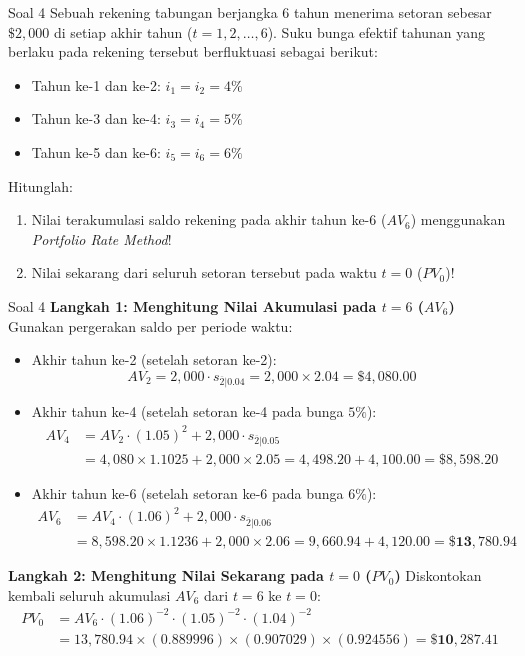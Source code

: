 \documentclass[11pt,a4paper]{article}
\begin{document}
\begin{problembox}{Soal 4}
Sebuah rekening tabungan berjangka 6 tahun menerima setoran sebesar $\$2{,}000$ di setiap akhir tahun ($t = 1, 2, \dots, 6$). Suku bunga efektif tahunan yang berlaku pada rekening tersebut berfluktuasi sebagai berikut:
\begin{itemize}
    \item Tahun ke-1 dan ke-2: $i_1 = i_2 = 4\%$
    \item Tahun ke-3 dan ke-4: $i_3 = i_4 = 5\%$
    \item Tahun ke-5 dan ke-6: $i_5 = i_6 = 6\%$
\end{itemize}
Hitunglah:
\begin{enumerate}[label=(\alph*)]
    \item Nilai terakumulasi saldo rekening pada akhir tahun ke-6 ($AV_6$) menggunakan \textit{Portfolio Rate Method}!
    \item Nilai sekarang dari seluruh setoran tersebut pada waktu $t = 0$ ($PV_0$)!
\end{enumerate}
\end{problembox}

\begin{solutionbox}{Soal 4}
\textbf{Langkah 1: Menghitung Nilai Akumulasi pada $t = 6$ ($AV_6$)}
Gunakan pergerakan saldo per periode waktu:
\begin{itemize}
    \item Akhir tahun ke-2 (setelah setoran ke-2):
    \begin{equation*}
        AV_2 = 2{,}000 \cdot s_{\overline{2}|0.04} = 2{,}000 \times 2.04 = \$4{,}080.00
    \end{equation*}
    \item Akhir tahun ke-4 (setelah setoran ke-4 pada bunga $5\%$):
    \begin{align*}
        AV_4 &= AV_2 \cdot (1.05)^2 + 2{,}000 \cdot s_{\overline{2}|0.05} \\
             &= 4{,}080 \times 1.1025 + 2{,}000 \times 2.05 = 4{,}498.20 + 4{,}100.00 = \$8{,}598.20
    \end{align*}
    \item Akhir tahun ke-6 (setelah setoran ke-6 pada bunga $6\%$):
    \begin{align*}
        AV_6 &= AV_4 \cdot (1.06)^2 + 2{,}000 \cdot s_{\overline{2}|0.06} \\
             &= 8{,}598.20 \times 1.1236 + 2{,}000 \times 2.06 = 9{,}660.94 + 4{,}120.00 = \mathbf{\$13{,}780.94}
    \end{align*}
\end{itemize}

\textbf{Langkah 2: Menghitung Nilai Sekarang pada $t = 0$ ($PV_0$)}
Diskontokan kembali seluruh akumulasi $AV_6$ dari $t = 6$ ke $t = 0$:
\begin{align*}
    PV_0 &= AV_6 \cdot (1.06)^{-2} \cdot (1.05)^{-2} \cdot (1.04)^{-2} \\
         &= 13{,}780.94 \times (0.889996) \times (0.907029) \times (0.924556) = \mathbf{\$10{,}287.41}
\end{align*}
\end{solutionbox}
\end{document}
